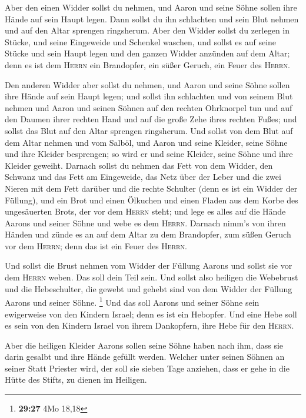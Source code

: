  Aber den einen Widder sollst du nehmen, und Aaron und
seine Söhne sollen ihre Hände auf sein Haupt legen.  Dann
sollst du ihn schlachten und sein Blut nehmen und auf den Altar sprengen
ringsherum.  Aber den Widder sollst du zerlegen in
Stücke, und seine Eingeweide und Schenkel waschen, und sollst es auf
seine Stücke und sein Haupt legen  und den ganzen Widder
anzünden auf dem Altar; denn es ist dem \textsc{Herrn} ein Brandopfer,
ein süßer Geruch, ein Feuer des \textsc{Herrn}.

 Den anderen Widder aber sollst du nehmen, und Aaron und
seine Söhne sollen ihre Hände auf sein Haupt legen;  und
sollst ihn schlachten und von seinem Blut nehmen und Aaron und seinen
Söhnen auf den rechten Ohrknorpel tun und auf den Daumen ihrer rechten
Hand und auf die große Zehe ihres rechten Fußes; und sollst das Blut auf
den Altar sprengen ringsherum.  Und sollst von dem Blut
auf dem Altar nehmen und vom Salböl, und Aaron und seine Kleider, seine
Söhne und ihre Kleider besprengen; so wird er und seine Kleider, seine
Söhne und ihre Kleider geweiht.  Darnach sollst du nehmen
das Fett von dem Widder, den Schwanz und das Fett am Eingeweide, das
Netz über der Leber und die zwei Nieren mit dem Fett darüber und die
rechte Schulter (denn es ist ein Widder der Füllung), 
und ein Brot und einen Ölkuchen und einen Fladen aus dem Korbe des
ungesäuerten Brots, der vor dem \textsc{Herrn} steht; 
und lege es alles auf die Hände Aarons und seiner Söhne und webe es dem
\textsc{Herrn}.  Darnach nimm's von ihren Händen und
zünde es an auf dem Altar zu dem Brandopfer, zum süßen Geruch vor dem
\textsc{Herrn}; denn das ist ein Feuer des \textsc{Herrn}.

 Und sollst die Brust nehmen vom Widder der Füllung
Aarons und sollst sie vor dem \textsc{Herrn} weben. Das soll dein Teil
sein.  Und sollst also heiligen die Webebrust und die
Hebeschulter, die gewebt und gehebt sind von dem Widder der Füllung
Aarons und seiner Söhne. \footnote{\textbf{29:27} 4Mo 18,18}
 Und das soll Aarons und seiner Söhne sein ewigerweise
von den Kindern Israel; denn es ist ein Hebopfer. Und eine Hebe soll es
sein von den Kindern Israel von ihrem Dankopfern, ihre Hebe für den
\textsc{Herrn}.

 Aber die heiligen Kleider Aarons sollen seine Söhne
haben nach ihm, dass sie darin gesalbt und ihre Hände gefüllt werden.
 Welcher unter seinen Söhnen an seiner Statt Priester
wird, der soll sie sieben Tage anziehen, dass er gehe in die Hütte des
Stifts, zu dienen im Heiligen.

